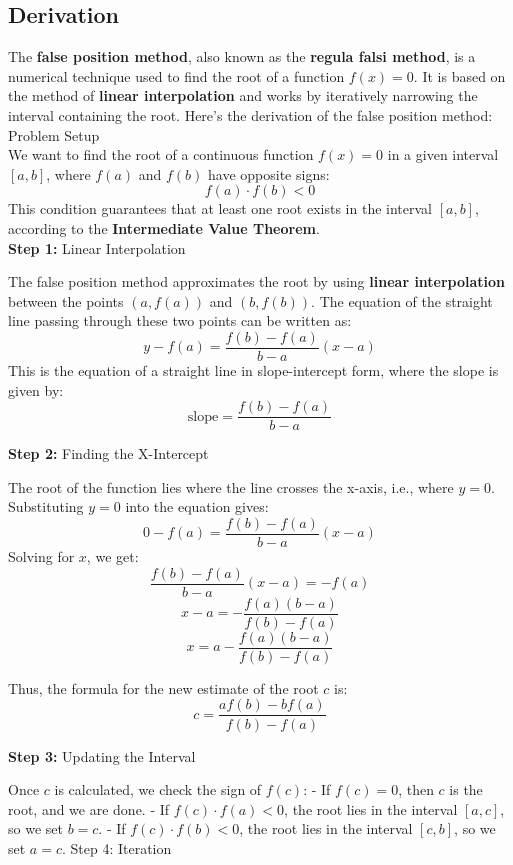 \documentclass[12pt,a4paper]{article}
\begin{document}
	\subsection{Derivation}
	The \textbf{false position method}, also known as the \textbf{regula falsi method}, is a numerical technique used to find the root of a function \( f(x) = 0 \). It is based on the method of \textbf{linear interpolation} and works by iteratively narrowing the interval containing the root. Here’s the derivation of the false position method:\\
	
	Problem Setup\\
	
	We want to find the root of a continuous function \( f(x) = 0 \) in a given interval \([a, b]\), where \( f(a) \) and \( f(b) \) have opposite signs:
	\[
	f(a) \cdot f(b) < 0
	\]
	This condition guarantees that at least one root exists in the interval \([a, b]\), according to the \textbf{Intermediate Value Theorem}.\\
	
	\textbf{Step 1:} Linear Interpolation
	
	The false position method approximates the root by using \textbf{linear interpolation} between the points \((a, f(a))\) and \((b, f(b))\). The equation of the straight line passing through these two points can be written as:
	\[
	y - f(a) = \frac{f(b) - f(a)}{b - a} (x - a)
	\]
	This is the equation of a straight line in slope-intercept form, where the slope is given by:
	\[
	\text{slope} = \frac{f(b) - f(a)}{b - a}
	\]
	
	\textbf{Step 2:} Finding the X-Intercept
	
	The root of the function lies where the line crosses the x-axis, i.e., where \( y = 0 \). Substituting \( y = 0 \) into the equation gives:
	\[
	0 - f(a) = \frac{f(b) - f(a)}{b - a} (x - a)
	\]
	Solving for \( x \), we get:
	\[
	\frac{f(b) - f(a)}{b - a} (x - a) = -f(a)
	\]
	\[
	x - a = -\frac{f(a)(b - a)}{f(b) - f(a)}
	\]
	\[
	x = a - \frac{f(a)(b - a)}{f(b) - f(a)}
	\]
	
	Thus, the formula for the new estimate of the root \( c \) is:
	\[
	c = \frac{a f(b) - b f(a)}{f(b) - f(a)}
	\]
	
	\textbf{Step 3:} Updating the Interval
	
	Once \( c \) is calculated, we check the sign of \( f(c) \):
	- If \( f(c) = 0 \), then \( c \) is the root, and we are done.
	- If \( f(c) \cdot f(a) < 0 \), the root lies in the interval \([a, c]\), so we set \( b = c \).
	- If \( f(c) \cdot f(b) < 0 \), the root lies in the interval \([c, b]\), so we set \( a = c \).
	Step 4: Iteration
	
\end{document}
